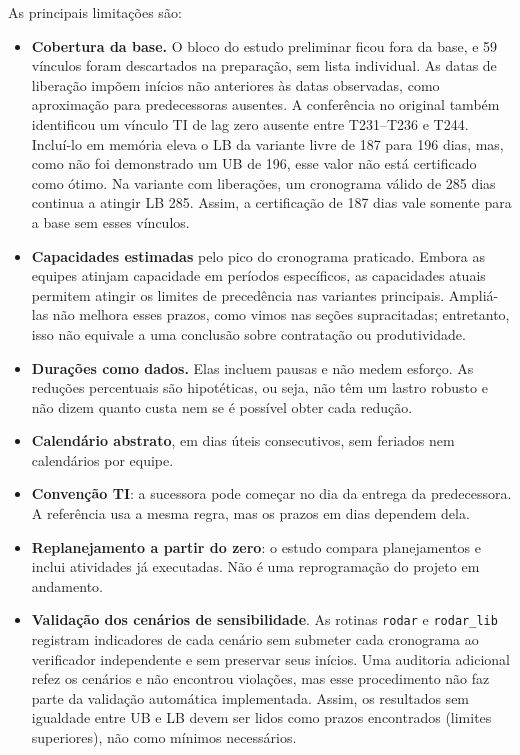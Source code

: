 As principais limitações são:
\begin{itemize}
  \item \textbf{Cobertura da base.} O bloco do estudo preliminar ficou
    fora da base, e 59 vínculos foram descartados na preparação, sem lista
    individual. As datas de liberação impõem inícios não anteriores às
    datas observadas, como aproximação para predecessoras ausentes. A
    conferência no original também identificou um vínculo TI de lag zero
    ausente entre T231--T236 e T244. Incluí-lo em memória eleva o LB da
    variante livre de 187 para 196 dias, mas, como não foi demonstrado um UB de
    196, esse valor não está certificado como ótimo. Na variante com
    liberações, um cronograma válido de 285 dias continua a atingir LB 285.
    Assim, a certificação de 187 dias vale somente para a base sem esses
    vínculos.
  \item \textbf{Capacidades estimadas} pelo pico do cronograma praticado.
    Embora as equipes atinjam capacidade em períodos específicos, as
    capacidades atuais permitem atingir os limites de precedência nas
    variantes principais. Ampliá-las não melhora esses prazos, como vimos nas seções supracitadas; entretanto, isso
    não equivale a uma conclusão sobre contratação ou produtividade.
  \item \textbf{Durações como dados.} Elas incluem pausas e não medem
    esforço. As reduções percentuais são hipotéticas, ou seja, não têm um lastro robusto e não dizem quanto
    custa nem se é possível obter cada redução.
  \item \textbf{Calendário abstrato}, em dias úteis consecutivos, sem
    feriados nem calendários por equipe.
  \item \textbf{Convenção TI}: a sucessora pode começar no dia da entrega
    da predecessora. A referência usa a mesma regra, mas os prazos em
    dias dependem dela.
  \item \textbf{Replanejamento a partir do zero}: o estudo compara
    planejamentos e inclui atividades já executadas. Não é uma
    reprogramação do projeto em andamento.
  \item \textbf{Validação dos cenários de sensibilidade}. As rotinas
    \texttt{rodar} e \texttt{rodar\_lib} registram indicadores de cada
    cenário sem submeter cada cronograma ao verificador independente e sem
    preservar seus inícios. Uma auditoria adicional refez os cenários e
    não encontrou violações, mas esse procedimento não faz parte da
    validação automática implementada. Assim, os resultados sem igualdade
    entre UB e LB devem ser lidos como prazos encontrados (limites
    superiores), não como mínimos necessários.
\end{itemize}
